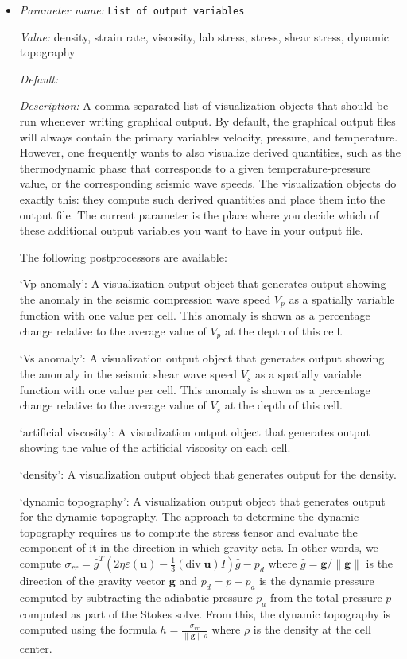 \begin{itemize}
{\it Possible values:} [Bool]
\item {\it Parameter name:} {\tt List of output variables}
\label{parameters:Postprocess/Visualization/List of output variables}


{\it Value:} density, strain rate, viscosity, lab stress, stress, shear stress, dynamic topography


{\it Default:} 


{\it Description:} A comma separated list of visualization objects that should be run whenever writing graphical output. By default, the graphical output files will always contain the primary variables velocity, pressure, and temperature. However, one frequently wants to also visualize derived quantities, such as the thermodynamic phase that corresponds to a given temperature-pressure value, or the corresponding seismic wave speeds. The visualization objects do exactly this: they compute such derived quantities and place them into the output file. The current parameter is the place where you decide which of these additional output variables you want to have in your output file.

The following postprocessors are available:

`Vp anomaly': A visualization output object that generates output showing the anomaly in the seismic compression wave speed $V_p$ as a spatially variable function with one value per cell. This anomaly is shown as a percentage change relative to the average value of $V_p$ at the depth of this cell.

`Vs anomaly': A visualization output object that generates output showing the anomaly in the seismic shear wave speed $V_s$ as a spatially variable function with one value per cell. This anomaly is shown as a percentage change relative to the average value of $V_s$ at the depth of this cell.

`artificial viscosity': A visualization output object that generates output showing the value of the artificial viscosity on each cell.

`density': A visualization output object that generates output for the density.

`dynamic topography': A visualization output object that generates output for the dynamic topography. The approach to determine the dynamic topography requires us to compute the stress tensor and evaluate the component of it in the direction in which gravity acts. In other words, we compute $\sigma_{rr}={\hat g}^T(2 \eta \varepsilon(\mathbf u)-\frac 13 (\textrm{div}\;\mathbf u)I)\hat g - p_d$ where $\hat g = \mathbf g/\|\mathbf g\|$ is the direction of the gravity vector $\mathbf g$ and $p_d=p-p_a$ is the dynamic pressure computed by subtracting the adiabatic pressure $p_a$ from the total pressure $p$ computed as part of the Stokes solve. From this, the dynamic topography is computed using the formula $h=\frac{\sigma_{rr}}{\|\mathbf g\| \rho}$ where $\rho$ is the density at the cell center.


\end{itemize}
